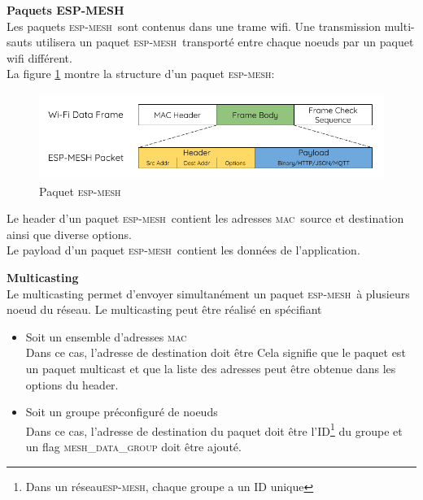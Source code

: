 \documentclass[a4paper, 12pt]{report}
\newcommand{\espmesh}{\textsc{esp-mesh}}
\newcommand{\mac}{\textsc{mac}}
\begin{document}
        \textbf{Paquets ESP-MESH}\\
            Les paquets \espmesh\ sont contenus dans une trame wifi. Une transmission multi-sauts utilisera un paquet \espmesh\ transporté entre chaque noeuds par un paquet wifi différent.\\
            La figure \ref{fig_meshPacket} montre la structure d'un paquet \espmesh:\\

            \begin{figure}[h]
                \centering
                \includegraphics[scale=0.5]{images/mesh-packet.png}
                \caption{Paquet \espmesh\ \cite{esp-mesh_w}}
                \label{fig_meshPacket}
            \end{figure}
            Le header d'un paquet \espmesh\ contient les adresses \mac\ source et destination ainsi que diverse options.\\
            Le payload d'un paquet \espmesh\ contient les données de l'application.
        
        \vspace{0.5cm}
        \textbf{Multicasting}\\
            Le multicasting permet d'envoyer simultanément un paquet \espmesh\ à plusieurs noeud du réseau. Le multicasting
            peut être réalisé en spécifiant
            \begin{itemize}
                \item Soit un ensemble d'adresses \mac\\
                    Dans ce cas, l'adresse de destination doit être
                    {\selectfont {}}
                    Cela signifie que le paquet est un paquet multicast et que la liste des adresses peut être obtenue dans les options du header.
                \item Soit un groupe préconfiguré de noeuds\\
                    Dans ce cas, l'adresse de destination du paquet doit être l'ID\footnote{Dans un réseau\espmesh, chaque groupe a un ID unique}
                    du groupe et un flag \textsc{mesh\_data\_group} doit être ajouté. %
            \end{itemize}
\end{document}
